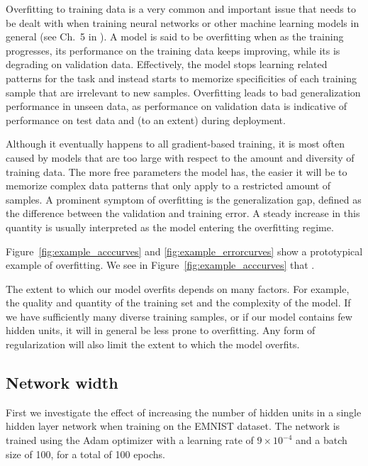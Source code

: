 \documentclass{article}
\begin{document}
Overfitting to training data is a very common and important issue that needs to be dealt with when training neural networks or other machine learning models in general (see Ch.~5 in \citealt{Goodfellow-et-al-2016}).
A model is said to be overfitting when as the training progresses, its performance on the training data keeps improving, while its is degrading on validation data. 
Effectively, the model stops learning related patterns for the task and instead starts to memorize specificities of each training sample that are irrelevant to new samples. 
Overfitting leads to bad generalization performance in unseen data, as performance on validation data is indicative of performance on test data and (to an extent) during deployment.

Although it eventually happens to all gradient-based training, it is most often caused by models that are too large with respect to the amount and diversity of training data. The more free parameters the model has, the easier it will be to memorize complex data patterns that only apply to a restricted amount of samples.
A prominent symptom of overfitting is the generalization gap, defined as the difference between the validation and training error. 
A steady increase in this quantity is usually interpreted as the model entering the overfitting regime.


Figure~\ref{fig:example_acccurves} and \ref{fig:example_errorcurves} show a prototypical example of overfitting.
We see in Figure~\ref{fig:example_acccurves} that \questionOne.

The extent to which our model overfits depends on many factors.
For example, the quality and quantity of the training set and the complexity of the model. 
If we have sufficiently many diverse training samples, or if our model contains few hidden units, it will in general be less prone to overfitting. 
Any form of regularization will also limit the extent to which the model overfits.


\subsection{Network width}

\questionTableOne
\questionFigureTwo

First we investigate the effect of increasing the number of hidden units in a single hidden layer network when training on the EMNIST dataset.
The network is trained using the Adam optimizer
with a learning rate of $9 \times 10^{-4}$ and a batch size of 100, for a total of 100 epochs.
\end{document}

